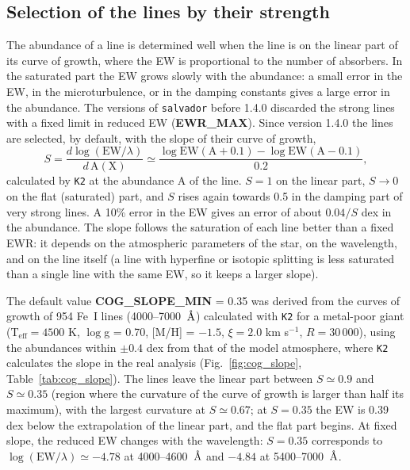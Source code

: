 \documentclass[modern]{aastex701}
\newcommand{\angstrom}{\mbox{\normalfont\AA}}
\begin{document}
\subsection{Selection of the lines by their strength} \label{sect:cog_slope}
The abundance of a line is determined well when the line is on the linear part of its curve of growth, where the EW is proportional to the number of absorbers. In the saturated part the EW grows slowly with the abundance: a small error in the EW, in the microturbulence, or in the damping constants gives a large error in the abundance. The versions of \texttt{salvador} before 1.4.0 discarded the strong lines with a fixed limit in reduced EW ({\bf EWR\_MAX}). Since version 1.4.0 the lines are selected, by default, with the slope of their curve of growth,
\begin{equation}
    S = \frac{d \log(\mathrm{EW}/\lambda)}{d\,\mathrm{A(X)}} \simeq \frac{\log \mathrm{EW}(\mathrm{A} + 0.1) - \log \mathrm{EW}(\mathrm{A} - 0.1)}{0.2},
\end{equation}
calculated by \texttt{K2} at the abundance A of the line. $S = 1$ on the linear part, $S \to 0$ on the flat (saturated) part, and $S$ rises again towards 0.5 in the damping part of very strong lines. A 10\% error in the EW gives an error of about $0.04/S$ dex in the abundance. The slope follows the saturation of each line better than a fixed EWR: it depends on the atmospheric parameters of the star, on the wavelength, and on the line itself (a line with hyperfine or isotopic splitting is less saturated than a single line with the same EW, so it keeps a larger slope).

The default value {\bf COG\_SLOPE\_MIN} = 0.35 was derived from the curves of growth of 954 Fe~I lines (4000--7000~$\angstrom$) calculated with \texttt{K2} for a metal-poor giant (T$_{\mathrm{eff}} = 4500$ K, $\log$g = 0.70, [M/H] = $-1.5$, $\xi = 2.0$ km s$^{-1}$, $R = 30\,000$), using the abundances within $\pm 0.4$ dex from that of the model atmosphere, where \texttt{K2} calculates the slope in the real analysis (Fig.~\ref{fig:cog_slope}, Table~\ref{tab:cog_slope}). The lines leave the linear part between $S \simeq 0.9$ and $S \simeq 0.35$ (region where the curvature of the curve of growth is larger than half its maximum), with the largest curvature at $S \simeq 0.67$; at $S = 0.35$ the EW is 0.39 dex below the extrapolation of the linear part, and the flat part begins. At fixed slope, the reduced EW changes with the wavelength: $S = 0.35$ corresponds to $\log(\mathrm{EW}/\lambda) \simeq -4.78$ at 4000--4600~$\angstrom$ and $-4.84$ at 5400--7000~$\angstrom$.
\end{document}
